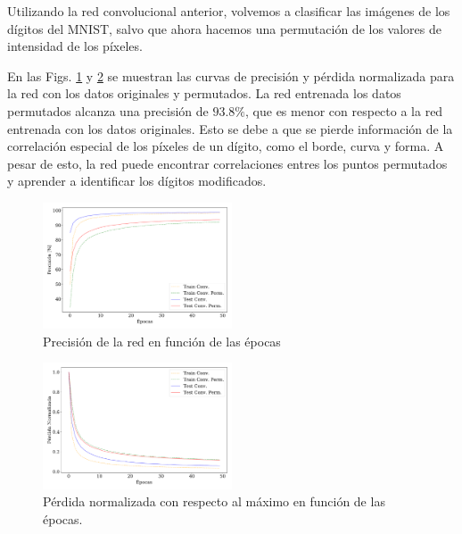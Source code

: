     Utilizando la red convolucional anterior, volvemos a clasificar las imágenes de los dígitos del MNIST, salvo que ahora hacemos una permutación de los valores de intensidad de los píxeles. 

    En las Figs. \ref{fig:ejer9_acc} y \ref{fig:ejer9_loss} se muestran las curvas de precisión y pérdida normalizada para la red con los datos originales y permutados. La red entrenada los datos permutados alcanza una precisión  de $93.8\%$, que es menor con respecto a la red entrenada con los datos originales. Esto se debe a que se pierde información de la correlación especial de los píxeles de un dígito, como el borde, curva y forma. A pesar de esto, la red puede encontrar correlaciones entres los puntos permutados  y aprender a identificar los dígitos modificados.

    \begin{figure}[H]
        \begin{small}
            \begin{center}
                \includegraphics[width=0.5\textwidth]{Graphs/ejer9_acc.pdf}
            \end{center}
            \caption{Precisión de la red en función de las épocas}
            \label{fig:ejer9_acc}
        \end{small}
    \end{figure}


    \begin{figure}[H]
        \begin{small}
            \begin{center}
                \includegraphics[width=0.5\textwidth]{Graphs/ejer9_loss.pdf}
            \end{center}
            \caption{Pérdida normalizada con respecto al máximo en función de las épocas. }
            \label{fig:ejer9_loss}
        \end{small}
    \end{figure}



